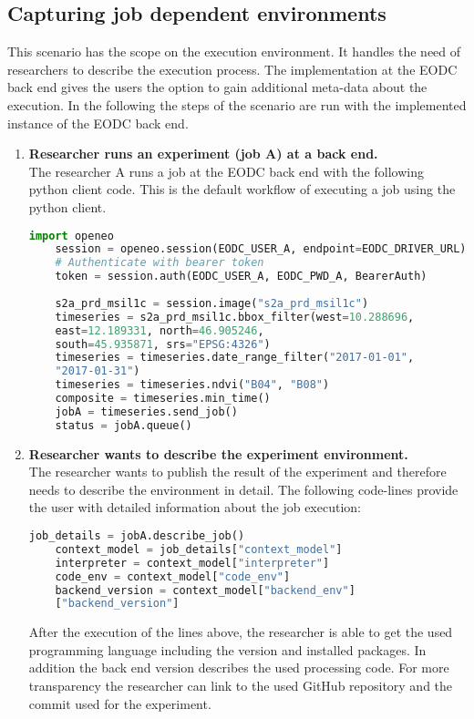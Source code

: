 \documentclass[draft,final]{vutinfth} %
\begin{document}
\subsection{Capturing job dependent environments}\label{Implementation:Use Case2}
This scenario has the scope on the execution environment. It handles the need of researchers to describe the execution process. The implementation at the EODC back end gives the users the option to gain additional meta-data about the execution. In the following the steps of the scenario are run with the implemented instance of the EODC back end.    

\begin{enumerate}
	\item \textbf{Researcher runs an experiment (job A) at a back end.}\\
	The researcher A runs a job at the EODC back end with the following python client code. This is the default workflow of executing a job using the python client.  
	\begin{lstlisting}[frame=single, language=Python]
	import openeo
	session = openeo.session(EODC_USER_A, endpoint=EODC_DRIVER_URL)
	# Authenticate with bearer token
	token = session.auth(EODC_USER_A, EODC_PWD_A, BearerAuth)
	
	s2a_prd_msil1c = session.image("s2a_prd_msil1c")
	timeseries = s2a_prd_msil1c.bbox_filter(west=10.288696, 
	east=12.189331, north=46.905246,
	south=45.935871, srs="EPSG:4326")
	timeseries = timeseries.date_range_filter("2017-01-01", 
	"2017-01-31")
	timeseries = timeseries.ndvi("B04", "B08")
	composite = timeseries.min_time()
	jobA = timeseries.send_job()
	status = jobA.queue()
	\end{lstlisting}
	\item \textbf{Researcher wants to describe the experiment environment.}\\
	The researcher wants to publish the result of the experiment and therefore needs to describe the environment in detail. The following code-lines provide the user with detailed information about the job execution:
	\begin{lstlisting}[frame=single, language=Python]
	job_details = jobA.describe_job()
	context_model = job_details["context_model"]
	interpreter = context_model["interpreter"]
	code_env = context_model["code_env"]
	backend_version = context_model["backend_env"]
	["backend_version"]
	\end{lstlisting}
	After the execution of the lines above, the researcher is able to get the used programming language including the version and installed packages. In addition the back end version describes the used processing code. For more transparency the researcher can link to the used GitHub repository and the commit used for the experiment. 
	
\end{enumerate}
\end{document}
